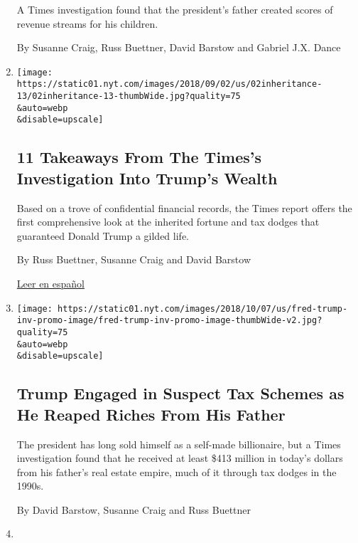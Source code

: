 \begin{enumerate}
  A Times investigation found that the president's father created scores
  of revenue streams for his children.

  By Susanne Craig, Russ Buettner, David Barstow and Gabriel J.X. Dance
\item
  \href{/2018/10/02/us/politics/donald-trump-wealth-fred-trump.html}{}

  \texttt{[image: https://static01.nyt.com/images/2018/09/02/us/02inheritance-13/02inheritance-13-thumbWide.jpg?quality=75\\\&auto=webp\\\&disable=upscale]}

  \hypertarget{11-takeaways-from-the-timess-investigation-into-trumps-wealth}{%
  \subsection{11 Takeaways From The Times's Investigation Into Trump's
  Wealth}\label{11-takeaways-from-the-timess-investigation-into-trumps-wealth}}

  Based on a trove of confidential financial records, the Times report
  offers the first comprehensive look at the inherited fortune and tax
  dodges that guaranteed Donald Trump a gilded life.

  By Russ Buettner, Susanne Craig and David Barstow

  \href{https://www.nytimes.com/es/2018/10/02/investigacion-fortuna-donald-trump/?}{Leer
  en español}
\item
  \href{/interactive/2018/10/02/us/politics/donald-trump-tax-schemes-fred-trump.html}{}

  \texttt{[image: https://static01.nyt.com/images/2018/10/07/us/fred-trump-inv-promo-image/fred-trump-inv-promo-image-thumbWide-v2.jpg?quality=75\\\&auto=webp\\\&disable=upscale]}

  \hypertarget{trump-engaged-in-suspect-tax-schemes-as-he-reaped-riches-from-his-father}{%
  \subsection{Trump Engaged in Suspect Tax Schemes as He Reaped Riches
  From His
  Father}\label{trump-engaged-in-suspect-tax-schemes-as-he-reaped-riches-from-his-father}}

  The president has long sold himself as a self-made billionaire, but a
  Times investigation found that he received at least \$413 million in
  today's dollars from his father's real estate empire, much of it
  through tax dodges in the 1990s.

  By David Barstow, Susanne Craig and Russ Buettner
\item
  \href{/2017/03/14/us/politics/donald-trump-taxes.html}{}


\end{enumerate}
